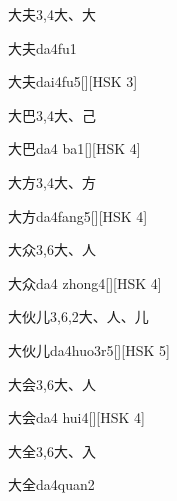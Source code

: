 \begin{entry}{大夫}{3,4}{⼤、⼤}
  \begin{phonetics}{大夫}{da4fu1}
  \end{phonetics}
  \begin{phonetics}{大夫}{dai4fu5}[][HSK 3]
  \end{phonetics}
\end{entry}

\begin{entry}{大巴}{3,4}{⼤、⼰}
  \begin{phonetics}{大巴}{da4 ba1}[][HSK 4]
  \end{phonetics}
\end{entry}

\begin{entry}{大方}{3,4}{⼤、⽅}
  \begin{phonetics}{大方}{da4fang5}[][HSK 4]
  \end{phonetics}
\end{entry}

\begin{entry}{大众}{3,6}{⼤、⼈}
  \begin{phonetics}{大众}{da4 zhong4}[][HSK 4]
  \end{phonetics}
\end{entry}

\begin{entry}{大伙儿}{3,6,2}{⼤、⼈、⼉}
  \begin{phonetics}{大伙儿}{da4huo3r5}[][HSK 5]
  \end{phonetics}
\end{entry}

\begin{entry}{大会}{3,6}{⼤、⼈}
  \begin{phonetics}{大会}{da4 hui4}[][HSK 4]
  \end{phonetics}
\end{entry}

\begin{entry}{大全}{3,6}{⼤、⼊}
  \begin{phonetics}{大全}{da4quan2}
  \end{phonetics}
\end{entry}


